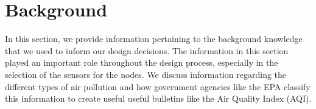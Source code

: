 \section{Background}
In this section, we provide information pertaining to the background knowledge that we used to inform our design decisions. The information in this section played an important role throughout the design process, especially in the selection of the sensors for the nodes. We discuss information regarding the different types of air pollution and how government agencies like the EPA classify this information to create useful useful bulletins like the Air Quality Index (AQI). 
